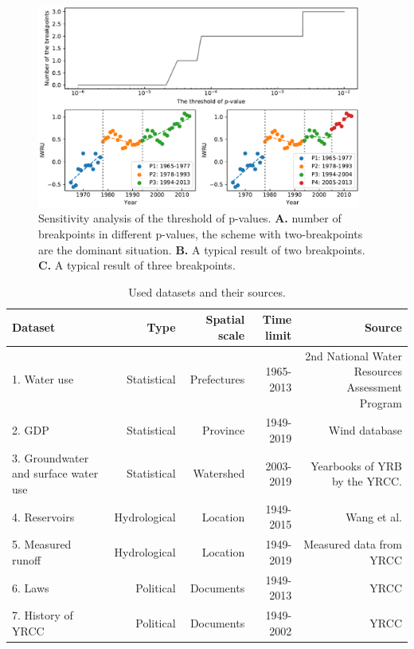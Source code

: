 \documentclass[9pt,twoside,lineno]{pnas-new}
\begin{document}


\begin{figure}
    \centering
    \includegraphics[width=0.95\textwidth]{../../figures/sup/sensitivity.pdf}
    \caption{
        Sensitivity analysis of the threshold of p-values.
        \textbf{A.} number of breakpoints in different p-values, the scheme with two-breakpoints are the dominant situation.
        \textbf{B.} A typical result of two breakpoints.
        \textbf{C.} A typical result of three breakpoints.
    }
\end{figure}


\begin{table}\centering
    \caption{Used datasets and their sources.}

    \begin{tabular}{lrrrr}
    Dataset & Type & Spatial scale & Time limit & Source \\
    \midrule
    1. Water use & Statistical & Prefectures & 1965-2013 & 2nd National Water Resources Assessment Program \\
    2. GDP & Statistical & Province & 1949-2019 & Wind database \\
    3. Groundwater and surface water use & Statistical & Watershed & 2003-2019 & Yearbooks of YRB by the YRCC. \\
    4. Reservoirs & Hydrological & Location & 1949-2015 & Wang et al. \cite{wangYellowRiverWater2019} \\
    5. Measured runoff & Hydrological & Location & 1949-2019 & Measured data from YRCC \\
    6. Laws & Political & Documents & 1949-2013 & YRCC \cite{yellowriverconservancycommissionYellowRiverBasin2013} \\
    7. History of YRCC & Political & Documents & 1949-2002 & YRCC \cite{ yellowriverarchivesOrganizationalHistoryYellow2004} \\
    \bottomrule
    \end{tabular}
\end{table}
\end{document}
